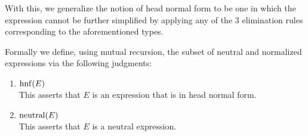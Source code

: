 \documentclass{article}
\begin{document}
With this, we generalize the notion of head normal form to be one in which
the expression cannot be further simplified by applying any of the 3
elimination rules corresponding to the aforementioned types.

Formally we define, using mutual recursion, the subset of neutral and 
normalized expressions via the following judgments:
\begin{enumerate}
  \item $\operatorname{hnf}(E)$ \\
    This asserts that $E$ is an expression that is in head normal form.
  
  \item $\operatorname{neutral}(E)$ \\
    This asserts that $E$ is a neutral expression.
\end{enumerate}
\end{document}
